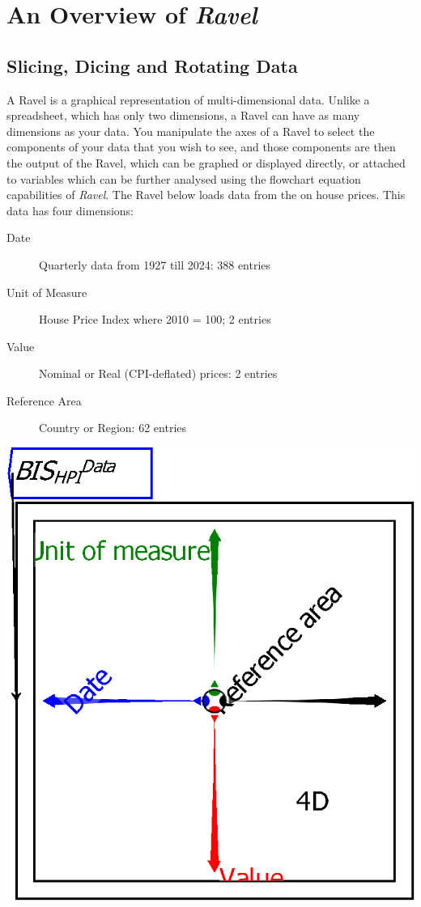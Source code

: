 
\chapter{An Overview of \emph{Ravel}}

\label{tutorial}

\section{Slicing, Dicing and Rotating Data}

A Ravel is a graphical representation of multi-dimensional data. Unlike
a spreadsheet, which has only two dimensions, a Ravel can have as
many dimensions as your data. You manipulate the axes of a Ravel to
select the components of your data that you wish to see, and those
components are then the output of the Ravel, which can be graphed
or displayed directly, or attached to variables which can be further
analysed using the flowchart equation capabilities of \emph{Ravel}.
The Ravel below loads data from the 
on house prices. This data has four dimensions:
\begin{description}
\item[Date] Quarterly data from 1927 till 2024: 388 entries 
\item[Unit of Measure] House Price Index where 2010 = 100; 2 entries 
\item[Value] Nominal or Real (CPI-deflated) prices: 2 entries 
\item[Reference Area] Country or Region: 62 entries 
\end{description}
\newpage

\includegraphics{images/tut00Ravel}

